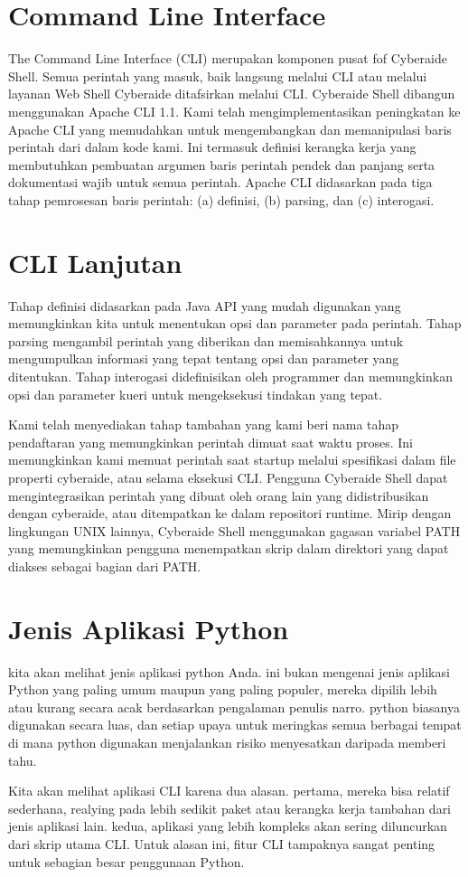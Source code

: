 \documentclass[12pt, times new roman, a4paper]{article}
\begin{document}
\section{Command Line Interface}
The Command Line Interface (CLI) merupakan komponen pusat fof Cyberaide Shell. Semua perintah yang masuk, baik langsung melalui CLI atau melalui layanan Web Shell Cyberaide ditafsirkan melalui CLI. Cyberaide Shell dibangun menggunakan Apache CLI 1.1. Kami telah mengimplementasikan peningkatan ke Apache CLI yang memudahkan untuk mengembangkan dan memanipulasi baris perintah dari dalam kode kami. Ini termasuk definisi kerangka kerja yang membutuhkan pembuatan argumen baris perintah pendek dan panjang serta dokumentasi wajib untuk semua perintah. Apache CLI didasarkan pada tiga tahap pemrosesan baris perintah: (a) definisi, (b) parsing, dan (c) interogasi.

\section{CLI Lanjutan}
Tahap definisi didasarkan pada Java API yang mudah digunakan yang memungkinkan kita untuk menentukan opsi dan parameter pada perintah. Tahap parsing mengambil perintah yang diberikan dan memisahkannya untuk mengumpulkan informasi yang tepat tentang opsi dan parameter yang ditentukan. Tahap interogasi didefinisikan oleh programmer dan memungkinkan opsi dan parameter kueri untuk mengeksekusi tindakan yang tepat.

Kami telah menyediakan tahap tambahan yang kami beri nama tahap pendaftaran yang memungkinkan perintah dimuat saat waktu proses. Ini memungkinkan kami memuat perintah saat startup melalui spesifikasi dalam file properti cyberaide, atau selama eksekusi CLI. Pengguna Cyberaide Shell dapat mengintegrasikan perintah yang dibuat oleh orang lain yang didistribusikan dengan cyberaide, atau ditempatkan ke dalam repositori runtime. Mirip dengan lingkungan UNIX lainnya, Cyberaide Shell menggunakan gagasan variabel PATH yang memungkinkan pengguna menempatkan skrip dalam direktori yang dapat diakses sebagai bagian dari PATH.

\section{Jenis Aplikasi Python}
kita akan melihat jenis aplikasi python Anda. ini bukan mengenai jenis aplikasi Python yang paling umum maupun yang paling populer, mereka dipilih lebih atau kurang secara acak berdasarkan pengalaman penulis narro. python biasanya digunakan secara luas, dan setiap upaya untuk meringkas semua berbagai tempat di mana python digunakan menjalankan risiko menyesatkan daripada memberi tahu.

Kita akan melihat aplikasi CLI karena dua alasan. pertama, mereka bisa relatif sederhana, realying pada lebih sedikit paket atau kerangka kerja tambahan dari jenis aplikasi lain. kedua, aplikasi yang lebih kompleks akan sering diluncurkan dari skrip utama CLI. Untuk alasan ini, fitur CLI tampaknya sangat penting untuk sebagian besar penggunaan Python.
\end{document}

